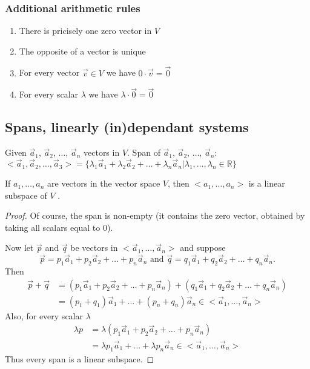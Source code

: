 \subsubsection{Additional arithmetic rules}
\begin{enumerate}
    \item There is pricisely one zero vector in $V$
    \item The opposite of a vector is unique
    \item For every vector $ \vec{v} \in V $ we have $ 0\cdot\vec{v} = \vec{0} $
    \item For every scalar $ \lambda $ we have $ \lambda\cdot\vec{0} = \vec{0} $
\end{enumerate}


\subsection{Spans, linearly (in)dependant systems}
\begin{definition}
    Given $\vec{a}_1$, $\vec{a}_2$, $\dots$, $\vec{a}_n$ vectors in $V$.
    \newline Span of $\vec{a}_1$, $\vec{a}_2$, $\dots$, $\vec{a}_n$:
    $<\vec{a}_1, \vec{a}_2, \dots, \vec{a}_3> = \{\lambda_1\vec{a}_1 + \lambda_2\vec{a}_2 + \dots + \lambda_n\vec{a}_n \vert \lambda_1,\dots,\lambda_n \in \mathbb{R}\}$
\end{definition}

\begin{theorem}
    If $a_1, \dots, a_n$ are vectors in the vector space $V$, then $< a_1 , \dots, a_n >$ is a linear subspace of $V$ .
\end{theorem}
\begin{proof}[Proof]
    Of course, the span is non-empty (it contains the zero vector, obtained by taking all scalars equal to $0$). \par
    Now let $\vec{p}$ and $\vec{q}$ be vectors in $<\vec{a}_1,\dots,\vec{a}_n> $ and suppose
    $$ \vec{p} = p_1\vec{a}_1 + p_2\vec{a}_2 + \dots + p_n\vec{a}_n \text{ and } \vec{q} = q_1\vec{a}_1+q_2\vec{a}_2+\dots+q_n\vec{a}_n.$$
    Then
    \begin{align*}
         \vec{p}+\vec{q} &= (p_1\vec{a}_1 + p_2\vec{a}_2 + \dots + p_n\vec{a}_n) + (q_1\vec{a}_1+q_2\vec{a}_2+\dots+q_n\vec{a}_n) \\
         &=(p_1+q_1)\vec{a}_1 + \dots + (p_n+q_n)\vec{a}_n \in <\vec{a}_1,\dots,\vec{a}_n>
    \end{align*}
    Also, for every scalar $ \lambda $
    \begin{align*}
        \lambda{p} &= \lambda(p_1\vec{a}_1 + p_2\vec{a}_2 + \dots + p_n\vec{a}_n) \\
        &= \lambda p_1\vec{a}_1 + \dots + \lambda p_n\vec{a}_n \in <\vec{a}_1, \dots, \vec{a}_n>
    \end{align*}
    Thus every span is a linear subspace.
\end{proof}


